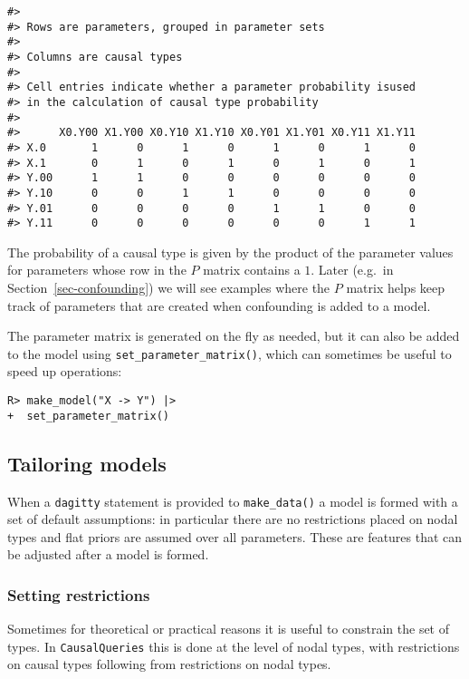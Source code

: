 \documentclass[
  11pt,
  article]{jss}
\begin{document}
\begin{verbatim}
#> 
#> Rows are parameters, grouped in parameter sets
#> 
#> Columns are causal types
#> 
#> Cell entries indicate whether a parameter probability isused
#> in the calculation of causal type probability
#> 
#>      X0.Y00 X1.Y00 X0.Y10 X1.Y10 X0.Y01 X1.Y01 X0.Y11 X1.Y11
#> X.0       1      0      1      0      1      0      1      0
#> X.1       0      1      0      1      0      1      0      1
#> Y.00      1      1      0      0      0      0      0      0
#> Y.10      0      0      1      1      0      0      0      0
#> Y.01      0      0      0      0      1      1      0      0
#> Y.11      0      0      0      0      0      0      1      1
\end{verbatim}

The probability of a causal type is given by the product of the
parameter values for parameters whose row in the \(P\) matrix contains a
\(1\). Later (e.g.~in Section~\ref{sec-confounding}) we will see
examples where the \(P\) matrix helps keep track of parameters that are
created when confounding is added to a model.

The parameter matrix is generated on the fly as needed, but it can also
be added to the model using \texttt{set\_parameter\_matrix()}, which can
sometimes be useful to speed up operations:

\begin{verbatim}
R> make_model("X -> Y") |> 
+  set_parameter_matrix()
\end{verbatim}

\hypertarget{tailoring-models}{%
\subsection{Tailoring models}\label{tailoring-models}}

When a \texttt{dagitty} statement is provided to \texttt{make\_data()} a
model is formed with a set of default assumptions: in particular there
are no restrictions placed on nodal types and flat priors are assumed
over all parameters. These are features that can be adjusted after a
model is formed.

\hypertarget{restrictions}{%
\subsubsection{Setting restrictions}\label{restrictions}}

Sometimes for theoretical or practical reasons it is useful to constrain
the set of types. In \texttt{CausalQueries} this is done at the level of
nodal types, with restrictions on causal types following from
restrictions on nodal types.
\end{document}
